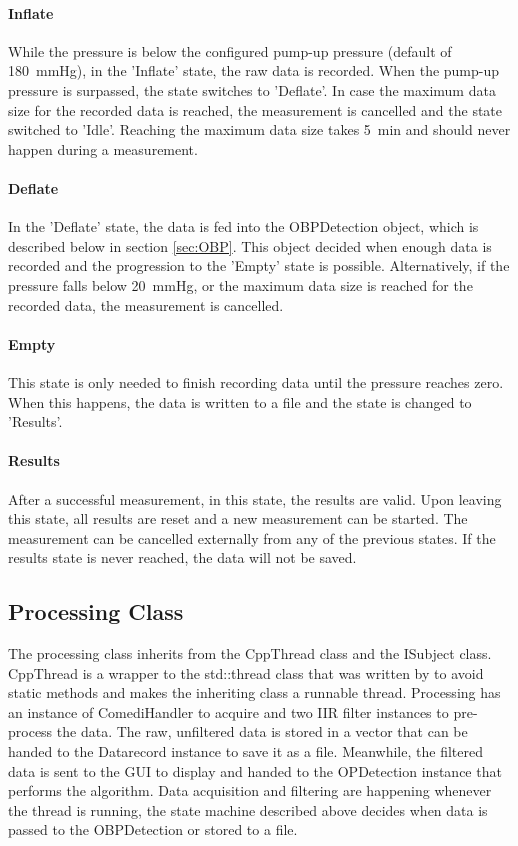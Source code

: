 \paragraph{Inflate} While the pressure is below the configured pump-up pressure (default of \SI{180}{\mmHg}), in the 'Inflate' state, the raw data is recorded. When the pump-up pressure is surpassed, the state switches to 'Deflate'. In case the maximum data size for the recorded data is reached, the measurement is cancelled and the state switched to 'Idle'. Reaching the maximum data size takes \SI{5}{\minute} and should never happen during a measurement.

\paragraph{Deflate} In the 'Deflate' state, the data is fed into the OBPDetection object, which is described below in section \ref{sec:OBP}. This object decided when enough data is recorded and the progression to the 'Empty' state is possible. Alternatively, if the pressure falls below \SI{20}{\mmHg}, or the maximum data size is reached for the recorded data, the measurement is cancelled. 

\paragraph{Empty} This state is only needed to finish recording data until the pressure reaches zero. When this happens, the data is written to a file and the state is changed to 'Results'.

\paragraph{Results} After a successful measurement, in this state, the results are valid. Upon leaving this state, all results are reset and a new measurement can be started. The measurement can be cancelled externally from any of the previous states.  If the results state is never reached, the data will not be saved.


\subsection{Processing Class} 
The processing class inherits from the CppThread class and the ISubject class. CppThread is a wrapper to the std::thread class that was written by \citet{Porr2020Thread} to avoid static methods and makes the inheriting class a runnable thread. Processing has an instance of ComediHandler to acquire and two IIR filter instances to pre-process the data. The raw, unfiltered data is stored in a vector that can be handed to the Datarecord instance to save it as a file. Meanwhile, the filtered data is sent to the GUI to display and handed to the OPDetection instance that performs the algorithm. Data acquisition and filtering are happening whenever the thread is running, the state machine described above decides when data is passed to the OBPDetection or stored to a file. 

